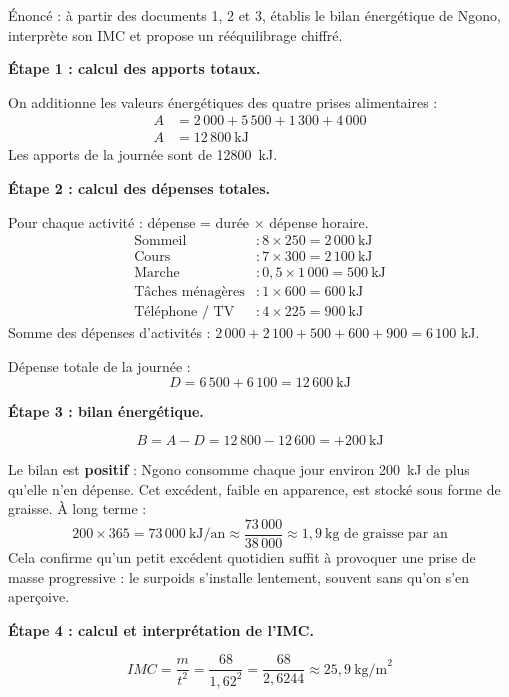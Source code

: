 \documentclass[11pt]{article}
\begin{document}
\begin{exoresolu}
Énoncé : à partir des documents 1, 2 et 3, établis le bilan énergétique de Ngono, interprète son IMC et propose un rééquilibrage chiffré.

\tcblower

\textbf{Étape 1 : calcul des apports totaux.}

On additionne les valeurs énergétiques des quatre prises alimentaires :
\begin{align*}
A &= 2\,000 + 5\,500 + 1\,300 + 4\,000 \\
A &= 12\,800 \ \text{kJ}
\end{align*}
Les apports de la journée sont de \SI{12800}{kJ}.

\textbf{Étape 2 : calcul des dépenses totales.}

Pour chaque activité : dépense = durée $\times$ dépense horaire.
\begin{align*}
\text{Sommeil} &: 8 \times 250 = 2\,000 \ \text{kJ} \\
\text{Cours} &: 7 \times 300 = 2\,100 \ \text{kJ} \\
\text{Marche} &: 0{,}5 \times 1\,000 = 500 \ \text{kJ} \\
\text{Tâches ménagères} &: 1 \times 600 = 600 \ \text{kJ} \\
\text{Téléphone / TV} &: 4 \times 225 = 900 \ \text{kJ}
\end{align*}
Somme des dépenses d'activités : $2\,000 + 2\,100 + 500 + 600 + 900 = 6\,100$ kJ.

Dépense totale de la journée :
\[ D = 6\,500 + 6\,100 = 12\,600 \ \text{kJ} \]

\textbf{Étape 3 : bilan énergétique.}

\[ B = A - D = 12\,800 - 12\,600 = +200 \ \text{kJ} \]

Le bilan est \textbf{positif} : Ngono consomme chaque jour environ \SI{200}{kJ} de plus qu'elle n'en dépense. Cet excédent, faible en apparence, est stocké sous forme de graisse. À long terme :
\[ 200 \times 365 = 73\,000 \ \text{kJ/an} \approx \frac{73\,000}{38\,000} \approx 1{,}9 \ \text{kg de graisse par an} \]
Cela confirme qu'un petit excédent quotidien suffit à provoquer une prise de masse progressive : le surpoids s'installe lentement, souvent sans qu'on s'en aperçoive.

\textbf{Étape 4 : calcul et interprétation de l'IMC.}

\[ IMC = \frac{m}{t^{2}} = \frac{68}{1{,}62^{2}} = \frac{68}{2{,}6244} \approx 25{,}9 \ \text{kg/m}^{2} \]


\end{exoresolu}
\end{document}
